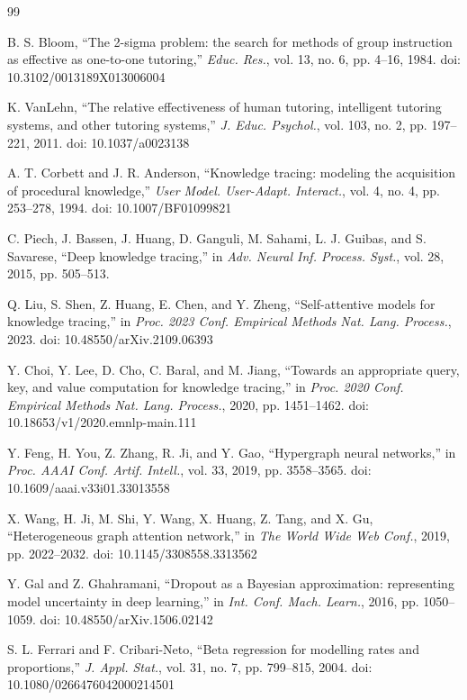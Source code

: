 \documentclass[preprint,12pt]{elsarticle}
\begin{document}
\begin{thebibliography}{99}

 B. S. Bloom, ``The 2-sigma problem: the search for methods of group instruction as effective as one-to-one tutoring,'' \textit{Educ. Res.}, vol. 13, no. 6, pp. 4--16, 1984. doi: 10.3102/0013189X013006004

 K. VanLehn, ``The relative effectiveness of human tutoring, intelligent tutoring systems, and other tutoring systems,'' \textit{J. Educ. Psychol.}, vol. 103, no. 2, pp. 197--221, 2011. doi: 10.1037/a0023138

 A. T. Corbett and J. R. Anderson, ``Knowledge tracing: modeling the acquisition of procedural knowledge,'' \textit{User Model. User-Adapt. Interact.}, vol. 4, no. 4, pp. 253--278, 1994. doi: 10.1007/BF01099821

 C. Piech, J. Bassen, J. Huang, D. Ganguli, M. Sahami, L. J. Guibas, and S. Savarese, ``Deep knowledge tracing,'' in \textit{Adv. Neural Inf. Process. Syst.}, vol. 28, 2015, pp. 505--513.

 Q. Liu, S. Shen, Z. Huang, E. Chen, and Y. Zheng, ``Self-attentive models for knowledge tracing,'' in \textit{Proc. 2023 Conf. Empirical Methods Nat. Lang. Process.}, 2023. doi: 10.48550/arXiv.2109.06393

 Y. Choi, Y. Lee, D. Cho, C. Baral, and M. Jiang, ``Towards an appropriate query, key, and value computation for knowledge tracing,'' in \textit{Proc. 2020 Conf. Empirical Methods Nat. Lang. Process.}, 2020, pp. 1451--1462. doi: 10.18653/v1/2020.emnlp-main.111

 Y. Feng, H. You, Z. Zhang, R. Ji, and Y. Gao, ``Hypergraph neural networks,'' in \textit{Proc. AAAI Conf. Artif. Intell.}, vol. 33, 2019, pp. 3558--3565. doi: 10.1609/aaai.v33i01.33013558

 X. Wang, H. Ji, M. Shi, Y. Wang, X. Huang, Z. Tang, and X. Gu, ``Heterogeneous graph attention network,'' in \textit{The World Wide Web Conf.}, 2019, pp. 2022--2032. doi: 10.1145/3308558.3313562

 Y. Gal and Z. Ghahramani, ``Dropout as a Bayesian approximation: representing model uncertainty in deep learning,'' in \textit{Int. Conf. Mach. Learn.}, 2016, pp. 1050--1059. doi: 10.48550/arXiv.1506.02142

 S. L. Ferrari and F. Cribari-Neto, ``Beta regression for modelling rates and proportions,'' \textit{J. Appl. Stat.}, vol. 31, no. 7, pp. 799--815, 2004. doi: 10.1080/0266476042000214501


\end{thebibliography}
\end{document}
